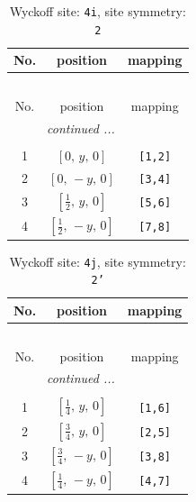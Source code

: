 \documentclass[fleqn,8pt]{jsarticle}
\begin{document}
\begin{longtable}{ccc}
\caption{Wyckoff site: {\tt 4i}, site symmetry: {\tt 2}}
 \\
 \hline \hline
No. & position & mapping \\ \hline \endfirsthead

\multicolumn{2}{l}{\tablename\ \thetable{}} \\
 \hline \hline
No. & position & mapping \\ \hline \endhead

 \hline \hline
\multicolumn{2}{r}{\footnotesize\it continued ...} \\ \endfoot

 \hline \hline
\multicolumn{2}{r}{} \\ \endlastfoot

1 & $\left[ 0,\, y,\, 0 \right]$ & {\tt [1,2]} \\ \hline
2 & $\left[ 0,\, - y,\, 0 \right]$ & {\tt [3,4]} \\ \hline
3 & $\left[ \frac{1}{2},\, y,\, 0 \right]$ & {\tt [5,6]} \\ \hline
4 & $\left[ \frac{1}{2},\, - y,\, 0 \right]$ & {\tt [7,8]} \\
\end{longtable}
\renewcommand{\arraystretch}{1.2}
\begin{longtable}{ccc}
\caption{Wyckoff site: {\tt 4j}, site symmetry: {\tt 2'}}
 \\
 \hline \hline
No. & position & mapping \\ \hline \endfirsthead

\multicolumn{2}{l}{\tablename\ \thetable{}} \\
 \hline \hline
No. & position & mapping \\ \hline \endhead

 \hline \hline
\multicolumn{2}{r}{\footnotesize\it continued ...} \\ \endfoot

 \hline \hline
\multicolumn{2}{r}{} \\ \endlastfoot

1 & $\left[ \frac{1}{4},\, y,\, 0 \right]$ & {\tt [1,6]} \\ \hline
2 & $\left[ \frac{3}{4},\, y,\, 0 \right]$ & {\tt [2,5]} \\ \hline
3 & $\left[ \frac{3}{4},\, - y,\, 0 \right]$ & {\tt [3,8]} \\ \hline
4 & $\left[ \frac{1}{4},\, - y,\, 0 \right]$ & {\tt [4,7]} \\
\end{longtable}
\end{document}
